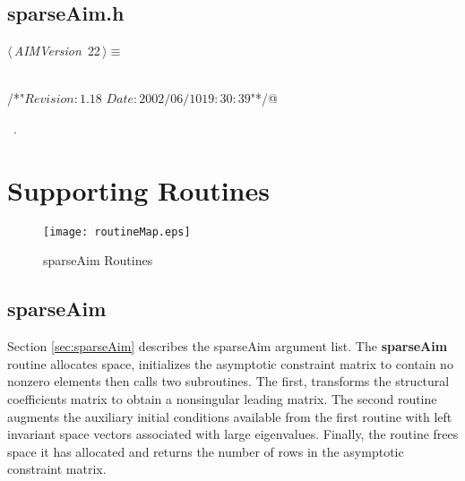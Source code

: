 \documentclass{article}
\begin{document}
\subsection{sparseAim.h} 
\label{sec:sparseAimh}

\begin{flushleft} \small
\begin{minipage}{\linewidth}\label{scrap21}\raggedright\small
{} $\langle\,${\itshape AIMVersion}\nobreak\ {\footnotesize {22}}$\,\rangle\equiv$
\vspace{-1ex}
\begin{list}{}{} \item
\mbox{}\verb@@\\
\mbox{}\verb@/*"$Revision: 1.18 $ $Date: 2002/06/10 19:30:39 $"*/@\\
\mbox{}\verb@@{\NWsep}
\end{list}
\vspace{-1.5ex}
\footnotesize
\begin{list}{}{\setlength{\itemsep}{-\parsep}\setlength{\itemindent}{-\leftmargin}}
\item \NWtxtMacroRefIn\ .

\item{}
\end{list}
\end{minipage}\vspace{4ex}
\end{flushleft}
\section{Supporting Routines}
\label{sec:supporting}


 \begin{sidewaysfigure}[htbp]
 \begin{center}
\texttt{[image: routineMap.eps]}
     \caption{sparseAim Routines}
     \label{fig:routines}
   \end{center}
 \end{sidewaysfigure}
\subsection{sparseAim}
\label{sec:sparseAimGuts}
Section \ref{sec:sparseAim} describes the sparseAim argument list.
The {\bf sparseAim} routine allocates space, 
initializes the asymptotic constraint matrix to contain
no nonzero elements then
calls two subroutines. The first, transforms the structural coefficients
matrix to obtain a nonsingular leading matrix. The second routine
augments the auxiliary initial conditions available from the 
first routine with left
invariant space vectors associated with large eigenvalues.
Finally, the routine frees space it has allocated and 
returns the number of rows in the asymptotic constraint matrix.
\end{document}
